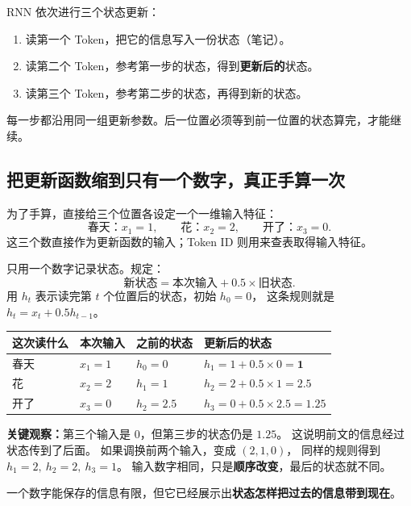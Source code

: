 RNN 依次进行三个状态更新：
\begin{enumerate}
\item 读第一个 Token，把它的信息写入一份状态（笔记）。
\item 读第二个 Token，参考第一步的状态，得到\textbf{更新后的}状态。
\item 读第三个 Token，参考第二步的状态，再得到新的状态。
\end{enumerate}


每一步都沿用同一组更新参数。后一位置必须等到前一位置的状态算完，才能继续。

\subsection{把更新函数缩到只有一个数字，真正手算一次}

为了手算，直接给三个位置各设定一个一维输入特征：
\[
\text{春天：}x_1=1,\qquad
\text{花：}x_2=2,\qquad
\text{开了：}x_3=0.
\]
这三个数直接作为更新函数的输入；Token ID 则用来查表取得输入特征。

只用一个数字记录状态。规定：
\[
\boxed{\text{新状态}=\text{本次输入}+0.5\times\text{旧状态}.}
\]
用 $h_t$ 表示读完第 $t$ 个位置后的状态，初始 $h_0=0$，
这条规则就是 $h_t=x_t+0.5h_{t-1}$。

\begin{center}
\small
\renewcommand{\arraystretch}{1.35}
\begin{tabularx}{\linewidth}{@{}p{19mm}p{20mm}p{26mm}X@{}}
\toprule
这次读什么 & 本次输入 & 之前的状态 & 更新后的状态\\
\midrule
春天 & $x_1=1$ & $h_0=0$ & $h_1=1+0.5\times0=\mathbf1$\\
花 & $x_2=2$ & $h_1=1$ & $h_2=2+0.5\times1=\mathbf{2.5}$\\
开了 & $x_3=0$ & $h_2=2.5$ & $h_3=0+0.5\times2.5=\mathbf{1.25}$\\
\bottomrule
\end{tabularx}
\end{center}



\textbf{关键观察：}第三个输入是 $0$，但第三步的状态仍是 $1.25$。
这说明前文的信息经过状态传到了后面。
如果调换前两个输入，变成 $(2,1,0)$，
同样的规则得到 $h_1=2,\ h_2=2,\ h_3=1$。
输入数字相同，只是\textbf{顺序改变}，最后的状态就不同。

一个数字能保存的信息有限，但它已经展示出\textbf{状态怎样把过去的信息带到现在}。

